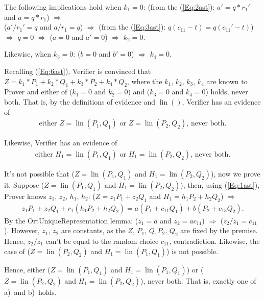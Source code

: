 \documentclass{mathcryptology} %
\DeclareMathOperator{\lin}{lin}
\theoremstyle{title}
\theoremstyle{titleof}
\renewenvironment{proof}{\noindent{\bfseries Proof:} }{}
\begin{document}
\begin{proof}
        The following implications hold when $k_{1}=0$: (from the (\ref{Eq:2ast}): $a'=q*r_{1}'$ and $a=q*r_{1}$) $\Rightarrow$ \\ ($a'/r_{1}'=q$ and $a/r_{1}=q$) $\Rightarrow$ (from the (\ref{Eq:3ast}): $q\left(c_{11} - t\right) = q\left(c_{11}'-t\right)$) $\Rightarrow$ $q=0$ $\Rightarrow$ ($a=0$ and $a'=0$) $\Rightarrow$ $k_{2}=0$.

        Likewise, when $k_{3}=0$: ($b=0$ and $b'=0$) $\Rightarrow$ $k_{4}=0$.

        Recalling (\ref{Eq:6ast}), Verifier is convinced that  $Z=k_{1}*P_{1} + k_{2}*Q_{1} + k_{3}*P_{2} + k_{4}*Q_{2}$, where the $k_{1}$, $k_{2}$, $k_{3}$, $k_{4}$ are known to Prover and either of ($k_{1}=0$ and $k_{2}=0$) and ($k_{3}=0$ and $k_{4}=0$) holds, never both.
        That is, by the definitions of evidence and $\lin()$, Verifier has an evidence of
        \begin{gather*}
        	\text{either $Z=\lin\left(P_{1}, Q_{1}\right)$ or $Z=\lin\left(P_{2}, Q_{2}\right)$, never both}.
        \end{gather*}

        Likewise, Verifier has an evidence of
        \begin{gather*}
            \text{either $H_{1}=\lin\left(P_{1}, Q_{1}\right)$ or $H_{1}=\lin\left(P_{2}, Q_{2}\right)$, never both}.
        \end{gather*}

        It's not possible that ($Z=\lin\left(P_{1}, Q_{1}\right)$ and $H_{1}=\lin\left(P_{2},Q_{2}\right)$), now we prove it. Suppose ($Z=\lin\left(P_{1}, Q_{1}\right)$ and $H_{1} = \lin\left(P_{2}, Q_{2}\right)$), then, using (\ref{Eq:1ast}), Prover knows $z_{1}$, $z_{2}$, $h_{1}$, $h_{2}$: ($Z=z_{1} P_{1} + z_{2} Q_{1}$ and $H_{1} =h_{1}P_{2}+h_{2} Q_{2}$) $\Rightarrow$
        \begin{gather*}
        	z_{1} P_{1}+ z_{2} Q_{1}+r_{1}\left(h_{1}P_{2}+h_{2}Q_{2}\right) = a\left(P_{1}+c_{11}Q_{1}\right)+b\left(P_{2}+c_{13}Q_{2}\right).
        \end{gather*}
        By the OrtUniqueRepresentation lemma: ($z_{1}=a$ and $z_{2} =ac_{11}$) $\Rightarrow$ ($z_{2}/z_{1}=c_{11}$).
        However, $z_{1}$, $z_{2}$ are constants, as the $Z$, $P_{1}$, $Q_{1}P_{2}$, $Q_{2}$ are fixed by the premise. Hence, $z_{2}/z_{1}$ can't be equal to the random choice $c_{11}$, contradiction.
        Likewise, the case of ($Z=\lin\left(P_{2}, Q_{2}\right)$ and $H_{1}=\lin\left(P_{1},Q_{1}\right)$) is not possible.

        Hence, either
        ($Z=\lin\left(P_{1},Q_{1}\right)$ and $H_{1} = \lin\left(P_{1},Q_{1}\right)$) or
        ($Z=\lin\left(P_{2},Q_{2}\right)$ and $H_{1} = \lin\left(P_{2},Q_{2}\right)$), never both. That is, exactly one of a)~and b)~holds.
    \end{proof}
\end{document}
